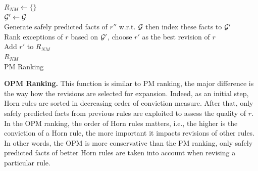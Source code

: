 \IncMargin{1.5em}
\begin{algorithm}[H]
\DontPrintSemicolon
\SetAlgoLined
{}
\BlankLine
$R_{NM} \leftarrow \{\}$\\
\BlankLine
{} {
	$\mathcal{G}' \leftarrow \mathcal{G}$\\
	 {
		Generate safely predicted facts of $r''$ w.r.t. $\mathcal{G}$ then index these facts to $\mathcal{G}'$\\
	}
	Rank exceptions of $r$ based on $\mathcal{G}'$, choose $r'$ as the best revision of $r$\\
	Add $r'$ to $R_{NM}$\\
}
\Return $R_{NM}$\\
\caption{PM Ranking}
\label{bf_pm_ranking_algo}
\end{algorithm}
\DecMargin{1.5em}

\textbf{OPM Ranking.} This function is similar to PM ranking, the major difference is the way how the revisions are selected for expansion. Indeed, as an initial step, Horn rules are sorted in decreasing order of conviction measure. After that, only safely predicted facts from previous rules are exploited to assess the quality of $r$. In the OPM ranking, the order of Horn rules matters, i.e., the higher is the conviction of a Horn rule, the more important it impacts revisions of other rules. In other words, the OPM is more conservative than the PM ranking, only safely predicted facts of better Horn rules are taken into account when revising a particular rule.


